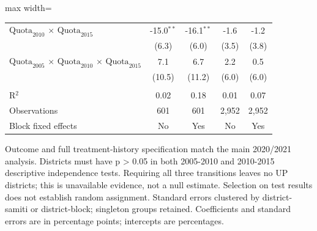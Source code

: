 \begin{adjustbox}{max width=\linewidth}
\begin{threeparttable}[b]
\begin{tabular}{lcccc}
         $\text{Quota}_{2010}$ $\times$ $\text{Quota}_{2015}$                                     & -15.0$^{**}$ & -16.1$^{**}$ & -1.6        & -1.2\\
                                                                                                  & (6.3)        & (6.0)        & (3.5)       & (3.8)\\
         $\text{Quota}_{2005}$ $\times$ $\text{Quota}_{2010}$ $\times$ $\text{Quota}_{2015}$      & 7.1          & 6.7          & 2.2         & 0.5\\
                                                                                                  & (10.5)       & (11.2)       & (6.0)       & (6.0)\\
          \\
         R$^2$                                                                                    & 0.02         & 0.18         & 0.01        & 0.07\\
         Observations                                                                             & 601          & 601          & 2,952       & 2,952\\
         Block fixed effects                                                                      & No           & Yes          & No          & Yes\\
         \bottomrule
      \end{tabular}

      \begin{tablenotes}
         \item Outcome and full treatment-history specification match the main 2020/2021 analysis. Districts must have p > 0.05 in both 2005-2010 and 2010-2015 descriptive independence tests. Requiring all three transitions leaves no UP districts; this is unavailable evidence, not a null estimate. Selection on test results does not establish random assignment. Standard errors clustered by district-samiti or district-block; singleton groups retained. Coefficients and standard errors are in percentage points; intercepts are percentages.
      \end{tablenotes}
   \end{threeparttable}
\end{adjustbox}
\par\endgroup



